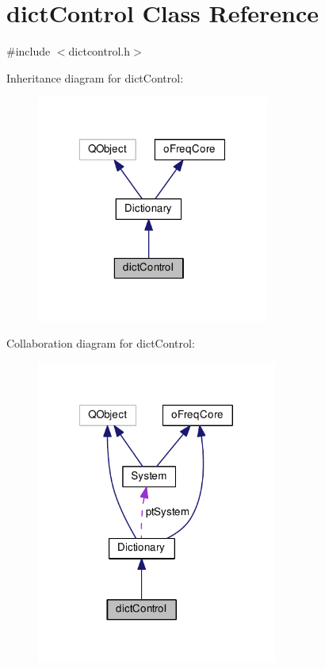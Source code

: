 \hypertarget{classdict_control}{\section{dict\-Control Class Reference}
\label{classdict_control}
}


{\ttfamily \#include $<$dictcontrol.\-h$>$}



Inheritance diagram for dict\-Control\-:\nopagebreak
\begin{figure}[H]
\begin{center}
\leavevmode
\includegraphics[width=217pt]{classdict_control__inherit__graph}
\end{center}
\end{figure}


Collaboration diagram for dict\-Control\-:\nopagebreak
\begin{figure}[H]
\begin{center}
\leavevmode
\includegraphics[width=224pt]{classdict_control__coll__graph}
\end{center}
\end{figure}
